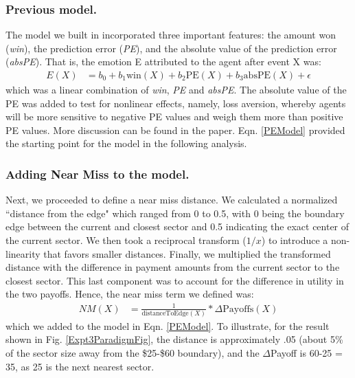 \documentclass[10pt,letterpaper]{article}
\begin{document}
\subsubsection{Previous model.} The model we built in  incorporated three important features: the amount won (\textit{win}), the prediction error (\textit{PE}), and the absolute value of the prediction error (\textit{absPE}). That is, the emotion E attributed to the agent after event X was:
\begin{align}
E(X) &= b_0 + b_1 \text{win}(X) + b_2 \text{PE}(X) + b_3 \text{absPE}(X) + \epsilon \label{PEModel}
\end{align}
which was a linear combination of \textit{win}, \textit{PE} and \textit{absPE}. The absolute value of the PE was added to test for nonlinear effects, namely, loss aversion, whereby agents will be more sensitive to negative PE values and weigh them more than positive PE values. More discussion can be found in the paper. Eqn. \ref{PEModel} provided the starting point for the model in the following analysis.


\subsubsection{Adding Near Miss to the model.}


Next, we proceeded to define a near miss distance. We calculated a normalized ``distance from the edge" which ranged from 0 to 0.5, with 0 being the boundary edge between the current and closest sector and 0.5 indicating the exact center of the current sector. We then took a reciprocal transform ($1/x$) to introduce a non-linearity that favors smaller distances. Finally, we multiplied the transformed distance with the difference in payment amounts from the current sector to the closest sector. This last component was to account for the difference in utility in the two payoffs. Hence, the near miss term we defined was:
\begin{align}
NM(X) &= \frac{1}{\text{distanceToEdge}(X)} * \Delta\text{Payoffs}(X) \label{NMRegressor}
\end{align}
which we added to the model in Eqn. \ref{PEModel}. To illustrate, for the result shown in Fig. \ref{Expt3ParadigmFig}, the distance is approximately .05 (about 5\% of the sector size away from the \$25-\$60 boundary), and the $\Delta$Payoff is 60-25 = 35, as 25 is the next nearest sector.
\end{document}
